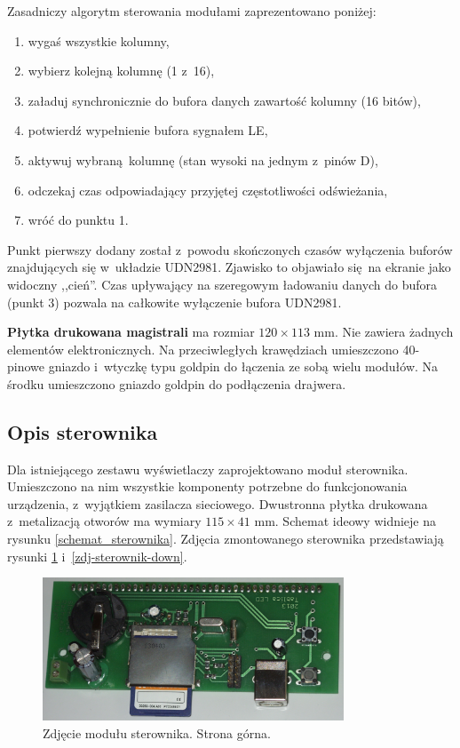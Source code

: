 Zasadniczy algorytm sterowania modułami zaprezentowano poniżej:
\begin{enumerate}
	\item wygaś wszystkie kolumny,
	\item wybierz kolejną kolumnę (1 z~16),
	\item załaduj synchronicznie do bufora danych zawartość kolumny (16 bitów),
	\item potwierdź wypełnienie bufora sygnałem LE,
	\item aktywuj wybraną kolumnę (stan wysoki na jednym z~pinów D),
	\item odczekaj czas odpowiadający przyjętej częstotliwości odświeżania,
	\item wróć do punktu 1.
\end{enumerate}

Punkt pierwszy dodany został z~powodu skończonych czasów wyłączenia buforów znajdujących się w~układzie UDN2981. Zjawisko to objawiało się na ekranie jako widoczny ,,cień''. Czas upływający na szeregowym ładowaniu danych do bufora (punkt 3) pozwala na całkowite wyłączenie bufora UDN2981. 

\textbf{Płytka drukowana magistrali} ma rozmiar $120 \times 113$ mm. Nie zawiera żadnych elementów elektronicznych. Na przeciwległych krawędziach umieszczono 40-pinowe gniazdo i~wtyczkę typu goldpin do łączenia ze sobą wielu modułów. Na środku umieszczono gniazdo goldpin do podłączenia drajwera.

\subsection{Opis sterownika}

Dla istniejącego zestawu wyświetlaczy zaprojektowano moduł sterownika. Umieszczono na nim wszystkie komponenty potrzebne do funkcjonowania urządzenia, z~wyjątkiem zasilacza sieciowego. Dwustronna płytka drukowana z~metalizacją otworów ma wymiary $115 \times 41$ mm.  Schemat ideowy widnieje na rysunku \ref{schemat_sterownika}. Zdjęcia zmontowanego sterownika przedstawiają rysunki \ref{zdj-sterownik-up} i~\ref{zdj-sterownik-down}.

\begin{figure}[tb]
    \begin{center}
       \includegraphics[width=0.8\textwidth]{figures/zdj-sterownik-up.jpg}
    \end{center}

    \caption{Zdjęcie modułu sterownika. Strona górna.}
    \label{zdj-sterownik-up}
\end{figure}

